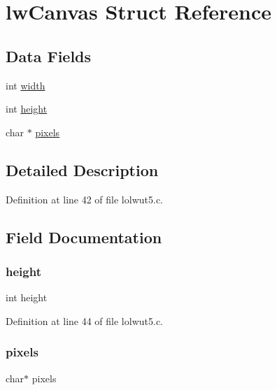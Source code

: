 \hypertarget{structlw_canvas}{}\section{lw\+Canvas Struct Reference}
\label{structlw_canvas}
\subsection*{Data Fields}
\begin{DoxyCompactItemize}
\item 
int \hyperlink{structlw_canvas_a2474a5474cbff19523a51eb1de01cda4}{width}
\item 
int \hyperlink{structlw_canvas_ad12fc34ce789bce6c8a05d8a17138534}{height}
\item 
char $\ast$ \hyperlink{structlw_canvas_afa6521e164d549ae3e927aac31252c83}{pixels}
\end{DoxyCompactItemize}


\subsection{Detailed Description}


Definition at line 42 of file lolwut5.\+c.



\subsection{Field Documentation}
\mbox{\label{structlw_canvas_ad12fc34ce789bce6c8a05d8a17138534}} 
\subsubsection{\texorpdfstring{height}{height}}
{\footnotesize\ttfamily int height}



Definition at line 44 of file lolwut5.\+c.

\mbox{\label{structlw_canvas_afa6521e164d549ae3e927aac31252c83}} 
\subsubsection{\texorpdfstring{pixels}{pixels}}
{\footnotesize\ttfamily char$\ast$ pixels}




